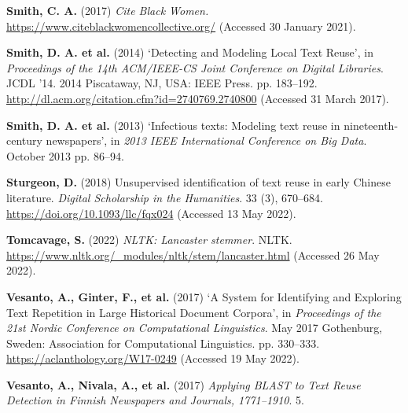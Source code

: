\documentclass[
]{article}
\newlength{\cslhangindent}
\newlength{\cslentryspacingunit} %
\newenvironment{CSLReferences}[2] %
 {%
  \setlength{\parindent}{0pt}
  \ifodd #1
  \let\oldpar\par
  \def\par{\hangindent=\cslhangindent\oldpar}
  \fi
  \setlength{\parskip}{#2\cslentryspacingunit}
 }%
 {}
\begin{document}
\begin{CSLReferences}{1}{0}
\leavevmode{}%
\textbf{Smith, C. A.} (2017) \emph{Cite {Black Women}.}
\url{https://www.citeblackwomencollective.org/} (Accessed 30 January
2021).

\leavevmode{}%
\textbf{Smith, D. A. et al.} (2014) {`Detecting and {Modeling Local Text
Reuse}'}, in \emph{Proceedings of the 14th {ACM}/{IEEE-CS Joint
Conference} on {Digital Libraries}}. {JCDL} '14. 2014 {Piscataway, NJ,
USA}: {IEEE Press}. pp. 183--192.
\url{http://dl.acm.org/citation.cfm?id=2740769.2740800} (Accessed 31
March 2017).

\leavevmode{}%
\textbf{Smith, D. A. et al.} (2013) {`Infectious texts: {Modeling} text
reuse in nineteenth-century newspapers'}, in \emph{2013 {IEEE
International Conference} on {Big Data}}. October 2013 pp. 86--94.

\leavevmode{}%
\textbf{Sturgeon, D.} (2018) Unsupervised identification of text reuse
in early {Chinese} literature. \emph{Digital Scholarship in the
Humanities}. 33 (3), 670--684. \url{https://doi.org/10.1093/llc/fqx024}
(Accessed 13 May 2022).

\leavevmode{}%
\textbf{Tomcavage, S.} (2022) \emph{NLTK: Lancaster stemmer}. NLTK.
\url{https://www.nltk.org/_modules/nltk/stem/lancaster.html} (Accessed
26 May 2022).

\leavevmode{}%
\textbf{Vesanto, A., Ginter, F., et al.} (2017) {`A {System} for
{Identifying} and {Exploring Text Repetition} in {Large Historical
Document Corpora}'}, in \emph{Proceedings of the 21st {Nordic
Conference} on {Computational Linguistics}}. May 2017 {Gothenburg,
Sweden}: {Association for Computational Linguistics}. pp. 330--333.
\url{https://aclanthology.org/W17-0249} (Accessed 19 May 2022).

\leavevmode{}%
\textbf{Vesanto, A., Nivala, A., et al.} (2017) \emph{Applying {BLAST}
to {Text Reuse Detection} in {Finnish Newspapers} and {Journals},
1771--1910}. 5.

\end{CSLReferences}
\end{document}
